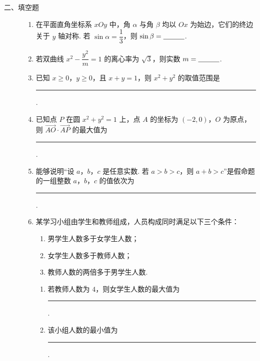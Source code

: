 \begin{description}

    \item[二、填空题]

    \begin{enumerate}[leftmargin=5pt]

      \addtocounter{enumi}{+8}

        \item 在平面直角坐标系 \(xOy\) 中，角 \(\alpha\) 与角 \(\beta\) 均以 \(Ox\) 为始边，它们的终边关于 \(y\) 轴对称. 若 \(\sin\alpha=\dfrac13\)，则 \(\sin\beta=\rule[-0.3ex]{3em}{0.4pt}\).

        \item 若双曲线 \(x^2-\dfrac{y^2}{m}=1\) 的离心率为 \(\sqrt3\)，则实数 \(m=\rule[-0.3ex]{3em}{0.4pt}\).

        \item 已知 \(x\ge0\)，\(y\ge0\)，且 \(x+y=1\)，则 \(x^2+y^2\) 的取值范围是\rule[-0.3ex]{3em}{0.4pt}.

        \item 已知点 \(P\) 在圆 \(x^2+y^2=1\) 上，点 \(A\) 的坐标为 \((-2,0)\)，\(O\) 为原点，则 \(\overrightarrow{AO}\cdot\overrightarrow{AP}\) 的最大值为\rule[-0.3ex]{3em}{0.4pt}.

        \item 能够说明“设 \(a\)，\(b\)，\(c\) 是任意实数. 若 \(a>b>c\)，则 \(a+b>c\)”是假命题的一组整数 \(a\)，\(b\)，\(c\) 的值依次为\rule[-0.3ex]{3em}{0.4pt}.

        \item 某学习小组由学生和教师组成，人员构成同时满足以下三个条件：

\begin{enumerate}
\item 男学生人数多于女学生人数；
\item 女学生人数多于教师人数；
\item 教师人数的两倍多于男学生人数.
\end{enumerate}
\begin{enumerate}
\item 若教师人数为 \(4\)，则女学生人数的最大值为\rule[-0.3ex]{3em}{0.4pt}.
\item 该小组人数的最小值为\rule[-0.3ex]{3em}{0.4pt}.
\end{enumerate}

    \end{enumerate}

\end{description}

